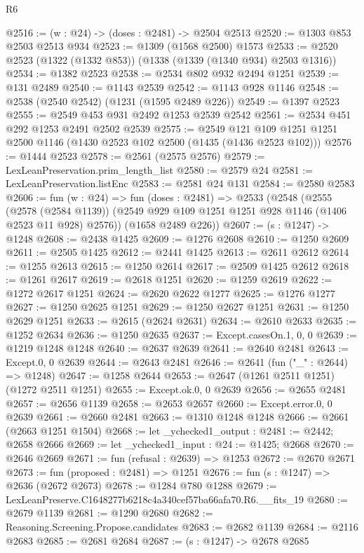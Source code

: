 \begin{lexlean}{R6}
\begin{coremodule}
@2516 := (w : @24) -> (doses : @2481) -> @2504 @2513
@2520 := @1303 @853 @2503 @2513 @934
@2523 := @1309 (@1568 @2500) @1573
@2533 := @2520 @2523 (@1322 (@1332 @853)) (@1338 (@1339 (@1340 @934) @2503 @1316))
@2534 := @1382 @2523
@2538 := @2534 @802 @932 @2494 @1251
@2539 := @131 @2489
@2540 := @1143 @2539
@2542 := @1143 @928 @1146
@2548 := @2538 (@2540 @2542) (@1231 (@1595 @2489 @226))
@2549 := @1397 @2523
@2555 := @2549 @453 @931 @2492 @1253 @2539 @2542
@2561 := @2534 @451 @292 @1253 @2491 @2502 @2539
@2575 := @2549 @121 @109 @1251 @1251 @2500 @1146 (@1430 @2523 @102 @2500 (@1435 (@1436 @2523 @102)))
@2576 := @1444 @2523
@2578 := @2561 (@2575 @2576)
@2579 := LexLeanPreservation.prim_length_list
@2580 := @2579 @24
@2581 := LexLeanPreservation.listEnc
@2583 := @2581 @24 @131
@2584 := @2580 @2583
@2606 := fun (w : @24) =>
  fun (doses : @2481) =>
  @2533
    (@2548
      (@2555
        (@2578 (@2584 @1139))
        (@2549 @929 @109 @1251 @1251 @928 @1146 (@1406 @2523 @11 @928) @2576))
      (@1658 @2489 @226))
@2607 := (s : @1247) -> @1248
@2608 := @2438 @1425
@2609 := @1276 @2608
@2610 := @1250 @2609
@2611 := @2505 @1425
@2612 := @2441 @1425
@2613 := @2611 @2612
@2614 := @1255 @2613
@2615 := @1250 @2614
@2617 := @2509 @1425 @2612
@2618 := @1261 @2617
@2619 := @2618 @1251
@2620 := @1259 @2619
@2622 := @1272 @2617 @1251
@2624 := @2620 @2622 @1277
@2625 := @1276 @1277
@2627 := @1250 @2625 @1251
@2629 := @1250 @2627 @1251
@2631 := @1250 @2629 @1251
@2633 := @2615 (@2624 @2631)
@2634 := @2610 @2633
@2635 := @1252 @2634
@2636 := @1250 @2635
@2637 := Except.casesOn.{1, 0, 0}
@2639 := @1219 @1248 @1248
@2640 := @2637 @2639
@2641 := @2640 @2481
@2643 := Except.{0, 0} @2639
@2644 := @2643 @2481
@2646 := @2641 (fun ("_" : @2644) => @1248)
@2647 := @1258 @2644
@2653 := @2647 (@1261 @2511 @1251) (@1272 @2511 @1251)
@2655 := Except.ok.{0, 0} @2639
@2656 := @2655 @2481
@2657 := @2656 @1139
@2658 := @2653 @2657
@2660 := Except.error.{0, 0} @2639
@2661 := @2660 @2481
@2663 := @1310 @1248 @1248
@2666 := @2661 (@2663 @1251 @1504)
@2668 := let _ychecked1_output : @2481 := @2442; @2658 @2666
@2669 := let _ychecked1_input : @24 := @1425; @2668
@2670 := @2646 @2669
@2671 := fun (refusal : @2639) => @1253
@2672 := @2670 @2671
@2673 := fun (proposed : @2481) => @1251
@2676 := fun (s : @1247) => @2636 (@2672 @2673)
@2678 := @1284 @780 @1288
@2679 := LexLeanPreserve.C1648277b6218c4a340cef57ba66afa70.R6.__fits_19
@2680 := @2679 @1139
@2681 := @1290 @2680
@2682 := Reasoning.Screening.Propose.candidates
@2683 := @2682 @1139
@2684 := @2116 @2683
@2685 := @2681 @2684
@2687 := (s : @1247) -> @2678 @2685

\end{coremodule}
\end{lexlean}
